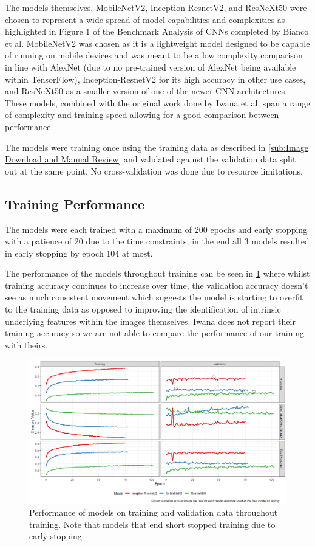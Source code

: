 \documentclass[12pt]{article}
\numberwithin{equation}{section}
\numberwithin{figure}{section}
\begin{document}
The models themselves, MobileNetV2, Inception-ResnetV2, and ResNeXt50 were chosen to represent a wide spread of model capabilities and complexities as highlighted in Figure 1 of the Benchmark Analysis of CNNs completed by Bianco et al\cite{Bianco2018}. MobileNetV2 was chosen as it is a lightweight model designed to be capable of running on mobile devices and was meant to be a low complexity comparison in line with AlexNet (due to no pre-trained version of AlexNet being available within TensorFlow), Inception-ResnetV2 for its high accuracy in other use cases, and ResNeXt50 as a smaller version of one of the newer CNN architectures. These models, combined with the original work done by Iwana et al, span a range of complexity and training speed allowing for a good comparison between performance.

The models were training once using the training data as described in \cref{sub:Image Download and Manual Review} and validated against the validation data split out at the same point. No cross-validation was done due to resource limitations.
\subsection{Training Performance} 
\label{sub:Training_Performance} 
The models were each trained with a maximum of 200 epochs and early stopping with a patience of 20 due to the time constraints; in the end all 3 models resulted in early stopping by epoch 104 at most. 

The performance of the models throughout training can be seen in \cref{fig:train_perf} where whilst training accuracy continues to increase over time, the validation accuracy doesn't see as much consistent movement which suggests the model is starting to overfit to the training data as opposed to improving the identification of intrinsic underlying features within the images themselves. Iwana does not report their training accuracy so we are not able to compare the performance of our training with theirs.

\begin{figure}
	\centering
	\captionsetup{justification=centering}
	\includegraphics[scale=0.5]{training_results.png}
	\caption{Performance of models on training and validation data throughout training. Note that models that end short stopped training due to early stopping.}
	\label{fig:train_perf}
\end{figure}
\end{document}
